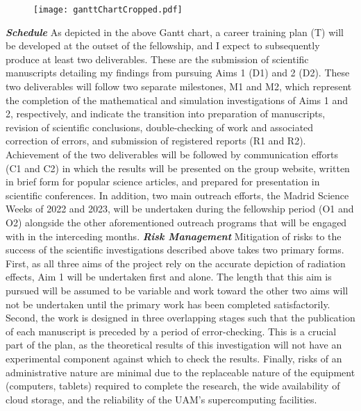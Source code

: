 \documentclass[11pt,a4paper]{article}
\begin{document}
\setlength{\intextsep}{5pt}
\begin{figure}[h!]
    \texttt{[image: ganttChartCropped.pdf]}
\end{figure}

\textbf{\textit{Schedule}} As depicted in the above Gantt chart, a career training plan (T) will be developed at the outset of the fellowship, and
I expect to subsequently produce at least two deliverables. These are the submission of scientific manuscripts detailing my findings from pursuing Aims 1 (D1) and 2 (D2). These two deliverables will follow two separate milestones, M1 and M2, which represent the completion of the mathematical and simulation investigations of Aims 1 and 2, respectively, and indicate the transition into preparation of manuscripts, revision of scientific conclusions, double-checking of work and associated correction of errors, and submission of registered reports (R1 and R2). Achievement of the two deliverables will be followed by communication efforts (C1 and C2) in which the results will be presented on the group website, written in brief form for popular science articles, and prepared for presentation in scientific conferences. In addition, two main outreach efforts, the Madrid Science Weeks of 2022 and 2023, will be undertaken during the fellowship period (O1 and O2) alongside the other aforementioned outreach programs that will be engaged with in the interceding months. \textbf{\textit{Risk Management}} Mitigation of risks to the success of the scientific investigations described above takes two primary forms. First, as all three aims of the project rely on the accurate depiction of radiation effects, Aim 1 will be undertaken first and alone. The length that this aim is pursued will be assumed to be variable and work toward the other two aims will not be undertaken until the primary work has been completed satisfactorily. Second, the work is designed in three overlapping stages such that the publication of each manuscript is preceded by a period of error-checking. This is a crucial part of the plan, as the theoretical results of this investigation will not have an experimental component against which to check the results. Finally, risks of an administrative nature are minimal due to the replaceable nature of the equipment (computers, tablets) required to complete the research, the wide availability of cloud storage, and the reliability of the UAM's supercomputing facilities.
\end{document}
